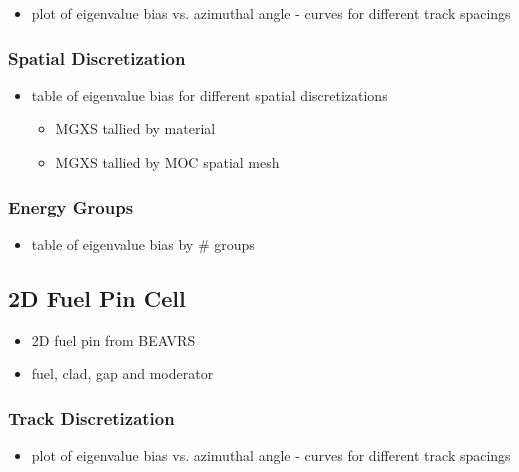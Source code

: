 \begin{itemize}
  \item plot of eigenvalue bias vs. azimuthal angle - curves for different track spacings
\end{itemize}

\subsubsection{Spatial Discretization}
\label{subsubsec:chap4-slab-space}

\begin{itemize}
  \item table of eigenvalue bias for different spatial discretizations
  \begin{itemize}
    \item \ac{MGXS} tallied by material
    \item \ac{MGXS} tallied by \ac{MOC} spatial mesh
  \end{itemize}
\end{itemize}

\subsubsection{Energy Groups}
\label{subsubsec:chap4-slab-energy}

\begin{itemize}
  \item table of eigenvalue bias by \# groups
\end{itemize}

\subsection{2D Fuel Pin Cell}
\label{subsec:chap4-pin}

\begin{itemize}
  \item 2D fuel pin from \ac{BEAVRS}
  \item fuel, clad, gap and moderator
\end{itemize}

\subsubsection{Track Discretization}
\label{subsubsec:chap4-pin-tracks}

\begin{itemize}
  \item plot of eigenvalue bias vs. azimuthal angle - curves for different track spacings
\end{itemize}

